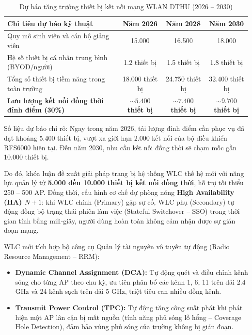 \begin{table}[htbp]
\centering
\caption{Dự báo tăng trưởng thiết bị kết nối mạng WLAN DTHU (2026 -- 2030)}
\label{tab:du_bao_tai}
\begin{tabular}{lccc}
\toprule
\textbf{Chỉ tiêu dự báo kỹ thuật} & \textbf{Năm 2026} & \textbf{Năm 2028} & \textbf{Năm 2030} \\
\midrule
Quy mô sinh viên và cán bộ giảng viên & 15.000 & 16.500 & 18.000 \\
Hệ số thiết bị cá nhân trung bình (BYOD/người) & 1.2 thiết bị & 1.5 thiết bị & 1.8 thiết bị \\
Tổng số thiết bị tiềm năng trong toàn trường & 18.000 thiết bị & 24.750 thiết bị & 32.400 thiết bị \\
\textbf{Lưu lượng kết nối đồng thời đỉnh điểm (30\%)} & \textbf{$\sim 5.400$ thiết bị} & \textbf{$\sim 7.400$ thiết bị} & \textbf{$\sim 9.700$ thiết bị} \\
\bottomrule
\end{tabular}
\end{table}

Số liệu dự báo chỉ rõ: Ngay trong năm 2026, tải lượng đỉnh điểm cần phục vụ đã đạt khoảng 5.400 thiết bị, vượt xa giới hạn 2.000 kết nối của bộ điều khiển RFS6000 hiện tại. Đến năm 2030, nhu cầu kết nối đồng thời sẽ chạm mốc gần 10.000 thiết bị.

Do đó, khóa luận đề xuất giải pháp trang bị hệ thống WLC thế hệ mới với năng lực quản lý từ \textbf{5.000 đến 10.000 thiết bị kết nối đồng thời}, hỗ trợ tối thiểu 250 -- 500 AP. Đồng thời, cấu hình cơ chế dự phòng nóng \textbf{High Availability (HA) $N+1$}: khi WLC chính (Primary) gặp sự cố, WLC phụ (Secondary) tự động đồng bộ trạng thái phiên làm việc (Stateful Switchover -- SSO) trong thời gian tính bằng mili-giây, người dùng hoàn toàn không cảm nhận được sự gián đoạn mạng.

WLC mới tích hợp bộ công cụ Quản lý tài nguyên vô tuyến tự động (Radio Resource Management -- RRM):
\begin{itemize}
    \item \textbf{Dynamic Channel Assignment (DCA):} Tự động quét và điều chỉnh kênh sóng cho từng AP theo chu kỳ, ưu tiên phân bổ các kênh 1, 6, 11 trên dải 2.4 GHz và 24 kênh sạch trên dải 5 GHz, triệt tiêu can nhiễu đồng kênh.
    \item \textbf{Transmit Power Control (TPC):} Tự động tăng công suất phát khi phát hiện một AP lân cận bị mất nguồn (tính năng phủ sóng lỗ hổng -- Coverage Hole Detection), đảm bảo vùng phủ sóng của trường không bị gián đoạn.
\end{itemize}

